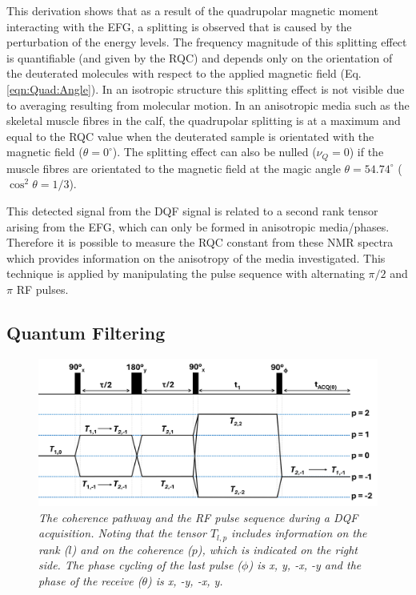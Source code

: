 This derivation shows that as a result of the quadrupolar magnetic moment interacting with the \ac{EFG}, a splitting is observed that is caused by the perturbation of the energy levels. The frequency magnitude of this splitting effect is quantifiable (and given by the \ac{RQC}) and depends only on the orientation of the deuterated  molecules with respect to the applied magnetic field (Eq. \ref{eqn:Quad:Angle}). In an isotropic structure this splitting effect is not visible due to averaging resulting from molecular motion. In an anisotropic media such as the skeletal muscle fibres in the calf, the quadrupolar splitting is at a maximum and equal to the \ac{RQC} value when the deuterated sample is orientated with the magnetic field ($\theta = 0^\circ$). The splitting effect can also be nulled ($\nu_Q = 0$) if the muscle fibres are orientated to the magnetic field at the magic angle $\theta = 54.74^\circ$ ($\cos^2\theta=1/3$).

This detected signal from the \ac{DQF} signal is related to a second rank tensor arising from the \ac{EFG}, which can only be formed in anisotropic media/phases. Therefore it is possible to measure the \ac{RQC} constant from these \ac{NMR} spectra which provides information on the anisotropy of the media investigated. This technique is applied by manipulating the pulse sequence with alternating $\pi/2$ and $\pi$ RF pulses. 

\subsection{Quantum Filtering}

\begin{figure}
    \centering
    \includegraphics[width=1\textwidth]{Figures/Quad/DQF_Coherence.png}
    \caption{\textit{The coherence pathway and the RF pulse sequence during a \ac{DQF} acquisition. Noting that the tensor $T_{l,p}$ includes information on the rank ($l$) and on the coherence ($p$), which is indicated on the right side. The phase cycling of the last pulse ($\phi$) is x, y, -x, -y and the phase of the receive ($\theta$) is x, -y, -x, y.}}
    \label{fig:Quad:Coherence}
\end{figure}

